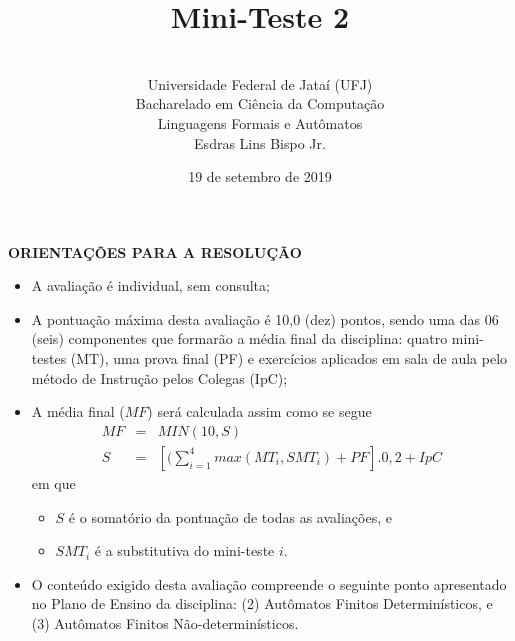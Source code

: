 \documentclass[12pt,a4paper,oneside]{article}
\author{\\Universidade Federal de Jataí (UFJ)\\Bacharelado em Ciência da Computação \\Linguagens Formais e Autômatos \\Esdras Lins Bispo Jr.}
\date{19 de setembro de 2019}
\title{\sc \huge Mini-Teste 2}
\begin{document}
\maketitle

{\bf ORIENTAÇÕES PARA A RESOLUÇÃO}

\small
 
\begin{itemize}
	\item A avaliação é individual, sem consulta;
	\item A pontuação máxima desta avaliação é 10,0 (dez) pontos, sendo uma das 06 (seis) componentes que formarão a média final da disciplina: quatro mini-testes (MT), uma prova final (PF) e exercícios aplicados em sala de aula pelo método de Instrução pelos Colegas (IpC);
	\item A média final ($MF$) será calculada assim como se segue
	\begin{eqnarray}
		MF & = & MIN(10, S) \nonumber \\
		S & = & [(\sum_{i=1}^{4} max(MT_i, SMT_i ) + PF].0,2  + IpC\nonumber
	\end{eqnarray}
	em que 
	\begin{itemize}
		\item $S$ é o somatório da pontuação de todas as avaliações, e
		\item $SMT_i$ é a substitutiva do mini-teste $i$.
	\end{itemize}
	\item O conteúdo exigido desta avaliação compreende o seguinte ponto apresentado no Plano de Ensino da disciplina: (2) Autômatos Finitos Determinísticos, e (3) Autômatos Finitos Não-determinísticos.
\end{itemize}

\begin{center}
\end{center}

\newpage
\end{document}
